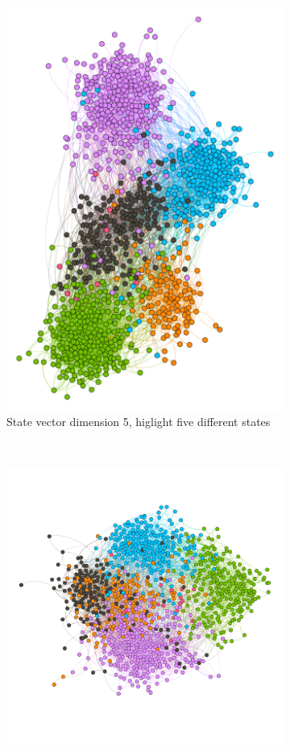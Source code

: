 \begin{figure}
\begin{subfigure}[t]{0.35\textwidth}
    \includegraphics[width=\textwidth]{img/dim5_mod.pdf}
    \caption{State vector dimension 5, higlight
      five different states}
    \label{fig:bubble5mod}
  \end{subfigure}
  ~
  \begin{subfigure}[t]{0.35\textwidth}
    \includegraphics[width=\textwidth]{img/dim7_mod.pdf}

\end{subfigure}
\end{figure}

